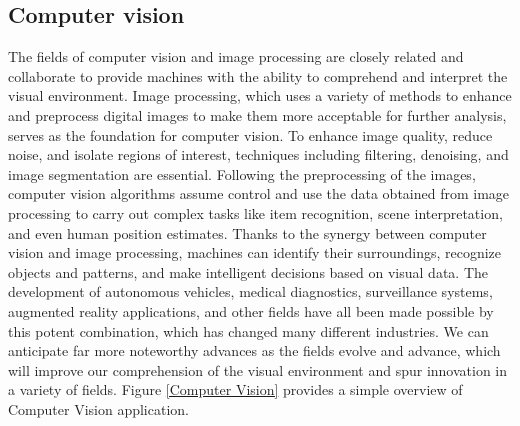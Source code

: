 \documentclass[a4paper,12pt]{report}%
\renewcommand{\\}{\vspace*{0.5\baselineskip} \newline}
\begin{document}
\subsection{Computer vision}

The fields of computer vision and image processing are closely related and collaborate to provide machines with the ability to comprehend and interpret the visual environment. Image processing, which uses a variety of methods to enhance and preprocess digital images to make them more acceptable for further analysis, serves as the foundation for computer vision. To enhance image quality, reduce noise, and isolate regions of interest, techniques including filtering, denoising, and image segmentation are essential. Following the preprocessing of the images, computer vision algorithms assume control and use the data obtained from image processing to carry out complex tasks like item recognition, scene interpretation, and even human position estimates.
Thanks to the synergy between computer vision and image processing, machines can identify their surroundings, recognize objects and patterns, and make intelligent decisions based on visual data. The development of autonomous vehicles, medical diagnostics, surveillance systems, augmented reality applications, and other fields have all been made possible by this potent combination, which has changed many different industries. We can anticipate far more noteworthy advances as the fields evolve and advance, which will improve our comprehension of the visual environment and spur innovation in a variety of fields. Figure \ref{Computer Vision} provides a simple overview of Computer Vision application.
\end{document}
